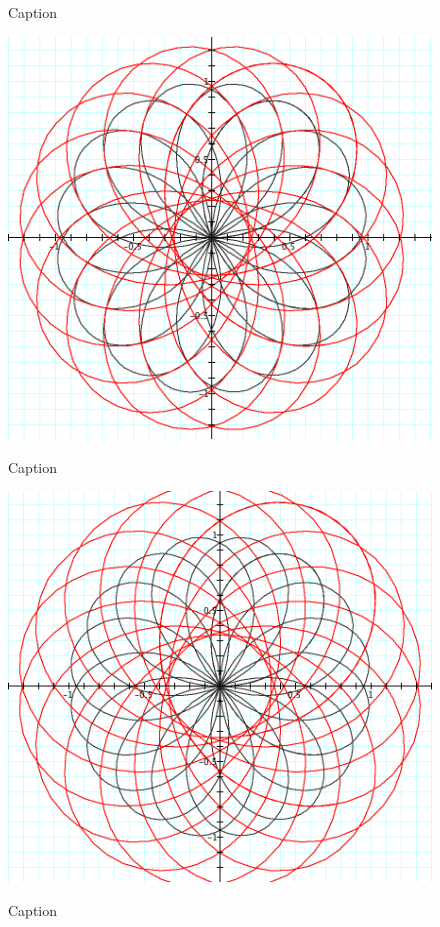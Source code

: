 {\begin{figure}[H]
\begin{minipage}[b]{\w}
      \caption{Caption}
      \vspace{4ex}
    \end{minipage} %
    \begin{minipage}[b]{\w}
      \centering
      \label{parametric:9}
      \includegraphics[width=\fw]{img/15-parametric/09.png}
      \caption{Caption}
      \vspace{4ex}
    \end{minipage} %
    \begin{minipage}[b]{\w}
      \centering
      \label{parametric:10}
      \includegraphics[width=\fw]{img/15-parametric/10.png}
      \caption{Caption}
      \vspace{4ex}
    \end{minipage} %
  \end{figure}

}

